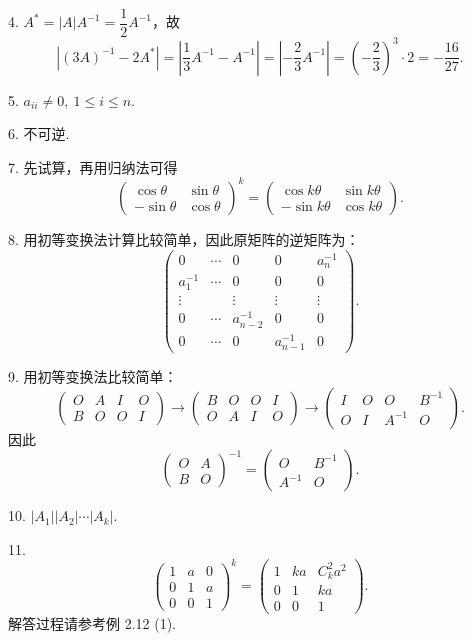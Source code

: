 \documentclass[UTF8, 12pt, fontset=fandol, oneside]{ctexart}
\begin{document}
4. $A^*=|A|A^{-1}=\dfrac12A^{-1}$，故
\[
|(3A)^{-1}-2A^*|
=\left|\frac13A^{-1}-A^{-1}\right|
=\left|-\frac23A^{-1}\right|
=\left(-\frac23\right)^3\cdot2
=-\frac{16}{27}.
\]

5. $a_{ii}\ne0,\ 1\le i\le n$.

6. 不可逆.

7. 先试算，再用归纳法可得
\[
\left(
\begin{array}{cc}
\cos\theta & \sin\theta\\
-\sin\theta & \cos\theta
\end{array}
\right)^k
=
\left(
\begin{array}{cc}
\cos k\theta & \sin k\theta\\
-\sin k\theta & \cos k\theta
\end{array}
\right).
\]

8. 用初等变换法计算比较简单，因此原矩阵的逆矩阵为：
\[
\left(
\begin{array}{ccccc}
0 & \cdots & 0 & 0 & a_n^{-1}\\
a_1^{-1} & \cdots & 0 & 0 & 0\\
\vdots & & \vdots & \vdots & \vdots\\
0 & \cdots & a_{n-2}^{-1} & 0 & 0\\
0 & \cdots & 0 & a_{n-1}^{-1} & 0
\end{array}
\right).
\]

9. 用初等变换法比较简单：
\[
\left(
\begin{array}{cc|cc}
O & A & I & O\\
B & O & O & I
\end{array}
\right)
\to
\left(
\begin{array}{cc|cc}
B & O & O & I\\
O & A & I & O
\end{array}
\right)
\to
\left(
\begin{array}{cc|cc}
I & O & O & B^{-1}\\
O & I & A^{-1} & O
\end{array}
\right).
\]
因此
\[
\left(
\begin{array}{cc}
O & A\\
B & O
\end{array}
\right)^{-1}
=
\left(
\begin{array}{cc}
O & B^{-1}\\
A^{-1} & O
\end{array}
\right).
\]

10. $|A_1||A_2|\cdots|A_k|$.

11.
\[
\left(
\begin{array}{ccc}
1 & a & 0\\
0 & 1 & a\\
0 & 0 & 1
\end{array}
\right)^k
=
\left(
\begin{array}{ccc}
1 & ka & C_k^2a^2\\
0 & 1 & ka\\
0 & 0 & 1
\end{array}
\right).
\]
解答过程请参考例 2.12 (1).
\end{document}
